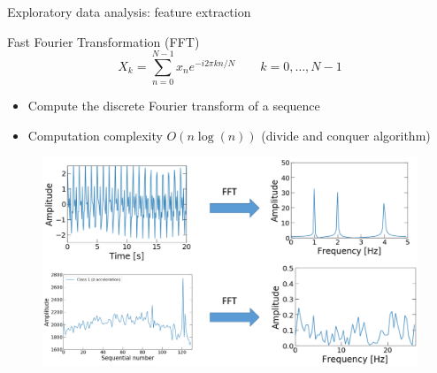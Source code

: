 \documentclass{if-beamer}
\begin{document}
\begin{frame}{Exploratory data analysis: feature extraction}
        \begin{block}{Fast Fourier Transformation (FFT)}
        \begin{equation}
        	X_k = \sum_{n=0}^{N-1} x_n e^{-i2\pi k n/N}  \qquad k = 0,\dots,N-1 
       \end{equation}         
        \begin{itemize}
         \item Compute the discrete Fourier transform of a sequence
         \item Computation complexity $O(n\log(n))$ (divide and conquer algorithm)
         \end{itemize}
         
         \vspace{-0.25cm}
         
               \begin{figure}
                \includegraphics[scale=0.25]{./figs/FFT.png}
                \end{figure} 
   	 \end{block}
	
\end{frame}
\end{document}
